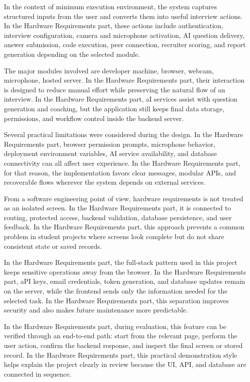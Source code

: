 \documentclass[12pt,a4paper]{report}
\begin{document}
In the context of minimum execution environment, the system captures structured inputs from the user and converts them into useful interview actions. In the Hardware Requirements part, these actions include authentication, interview configuration, camera and microphone activation, AI question delivery, answer submission, code execution, peer connection, recruiter scoring, and report generation depending on the selected module.


The major modules involved are developer machine, browser, webcam, microphone, hosted server. In the Hardware Requirements part, their interaction is designed to reduce manual effort while preserving the natural flow of an interview. In the Hardware Requirements part, aI services assist with question generation and coaching, but the application still keeps final data storage, permissions, and workflow control inside the backend server.


Several practical limitations were considered during the design. In the Hardware Requirements part, browser permission prompts, microphone behavior, deployment environment variables, AI service availability, and database connectivity can all affect user experience. In the Hardware Requirements part, for that reason, the implementation favors clear messages, modular APIs, and recoverable flows wherever the system depends on external services.


From a software engineering point of view, hardware requirements is not treated as an isolated screen. In the Hardware Requirements part, it is connected to routing, protected access, backend validation, database persistence, and user feedback. In the Hardware Requirements part, this approach prevents a common problem in student projects where screens look complete but do not share consistent state or saved records.


In the Hardware Requirements part, the full-stack pattern used in this project keeps sensitive operations away from the browser. In the Hardware Requirements part, aPI keys, email credentials, token generation, and database updates remain on the server, while the frontend sends only the information needed for the selected task. In the Hardware Requirements part, this separation improves security and also makes future maintenance more predictable.


In the Hardware Requirements part, during evaluation, this feature can be verified through an end-to-end path: start from the relevant page, perform the user action, confirm the backend response, and inspect the final screen or stored record. In the Hardware Requirements part, this practical demonstration style helps explain the project clearly in review because the UI, API, and database are connected in sequence.
\end{document}

